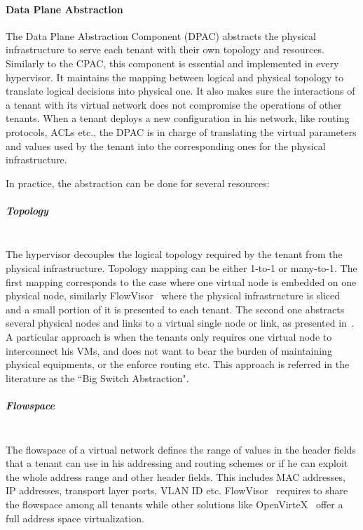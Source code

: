 \paragraph{Data Plane Abstraction}
\label{sec:abstraction_comp}
The Data Plane Abstraction Component (DPAC) abstracts the physical infrastructure to serve each tenant with their own topology and resources.
Similarly to the CPAC, this component is essential and implemented in every hypervisor.
It maintains the mapping between logical and physical topology to translate logical decisions into physical one.
It also makes sure the interactions of a tenant with its virtual network does not compromise the operations of other tenants. When a tenant deploys a new configuration in his network, like routing protocols, ACLs etc., the DPAC is in charge of translating the virtual parameters and values used by the tenant into the corresponding ones for the physical infrastructure.

In practice, the abstraction can be done for several resources:

\subparagraph{\textbf{Topology}}\textbf{}\\
The hypervisor decouples the logical topology required by the tenant from the physical infrastructure.
Topology mapping can be either 1-to-1 or many-to-1. 
The first mapping corresponds to the case where one virtual node is embedded on one physical node, similarly FlowVisor~\cite{FlowVisor-Sherwood2009} where the physical infrastructure is sliced and a small portion of it is presented to each tenant.
The second one abstracts several physical nodes and links to a virtual single node or link, as  presented in~\cite{OpenVirteX-Al-Shabibi2014}.
A particular approach is when the tenants only requires one virtual node to interconnect his VMs, and does not want to bear the burden of maintaining physical equipments, or the enforce routing etc. This approach is referred in the literature as the ``Big Switch Abstraction".


\subparagraph{\textbf{Flowspace}}\textbf{}\\
The flowspace of a virtual network defines the range of values in the header fields that a tenant can use in his addressing and routing schemes or if he can exploit the whole address range and other header fields.
This includes MAC addresses, IP addresses, transport layer ports, VLAN ID etc.
FlowVisor~\cite{FlowVisor-Sherwood2009} requires to share the flowspace among all tenants while other solutions like OpenVirteX~\cite{OpenVirteX-Al-Shabibi2014} offer a full address space virtualization.

